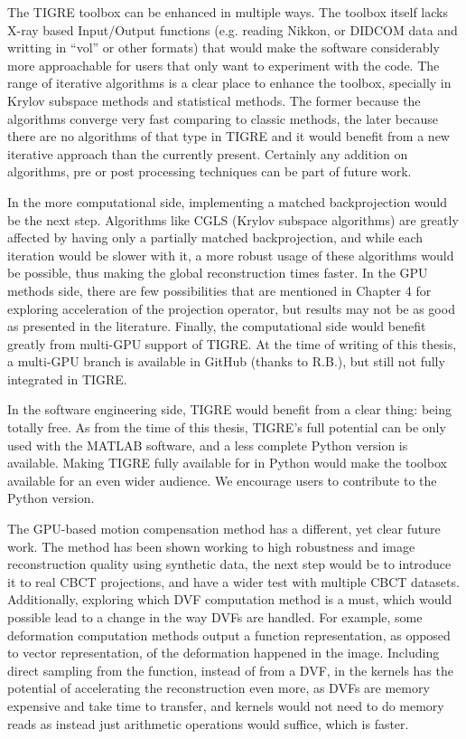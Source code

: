 The TIGRE toolbox can be enhanced in multiple ways. The toolbox itself lacks X-ray based Input/Output functions (e.g. reading Nikkon, or DIDCOM data and writting in ``vol'' or other formats) that would make the software considerably more approachable for users that only want to experiment with the code. The range of iterative algorithms is a clear place to enhance the toolbox, specially in Krylov subspace methods and statistical methods. The former because the algorithms converge very fast comparing to classic methods, the later because there are no algorithms of that type in TIGRE and it would benefit from a new iterative approach than the currently present. Certainly any addition on algorithms, pre or post processing techniques can be part of future work.

In the more computational side, implementing a matched backprojection would be the next step. Algorithms like CGLS (Krylov subspace algorithms) are greatly affected by having only a partially matched backprojection, and while each iteration would be slower with it, a more robust usage of these algorithms would be possible, thus making the global reconstruction times faster. In the GPU methods side, there are few possibilities that are mentioned in Chapter 4 for exploring acceleration of the projection operator, but results may not be as good as presented in the literature. Finally, the computational side would benefit greatly from multi-GPU support of TIGRE. At the time of writing of this thesis, a multi-GPU branch is available in GitHub (thanks to R.B.), but still not fully integrated in TIGRE.

In the software engineering side, TIGRE would benefit from a clear thing: being totally free. As from the time of this thesis, TIGRE's full potential can be only used with the MATLAB software, and a less complete Python version is available. Making TIGRE fully available for in Python would make the toolbox available for an even wider audience. We encourage users to contribute to the Python version.

The GPU-based motion compensation method has a different, yet clear future work. The method has been shown working to high robustness and image reconstruction quality using synthetic data, the next step would be to introduce it to real CBCT projections,  and have a wider test with multiple CBCT datasets. Additionally, exploring which DVF computation method is a must, which would possible lead to a change in the way DVFs are handled. For example, some deformation computation methods output a function representation, as opposed to vector representation, of the deformation happened in the image. Including direct sampling from the function, instead of from a DVF, in the kernels has the potential of accelerating the reconstruction even more, as DVFs are memory expensive and take time to transfer, and kernels would not need to do memory reads as instead just arithmetic operations would suffice, which is faster.

